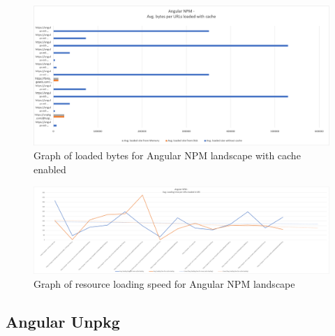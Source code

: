 \newpage
\begin{figure}[!h]
	\centering
	\includegraphics[width=1.4\textwidth, angle=90]{Figures/angular_npm_bytes_cache.png}
	\caption{Graph of loaded bytes for Angular NPM landscape with cache enabled}
	\label{fig:appendix_1_4}
\end{figure}
\newpage
\begin{figure}[!h]
	\centering
	\includegraphics[width=1.4\textwidth, angle=90]{Figures/angular_npm_speed.png}
	\caption{Graph of resource loading speed for Angular NPM landscape}
	\label{fig:appendix_1_5}
\end{figure}
\newpage

\subsection{Angular Unpkg}

